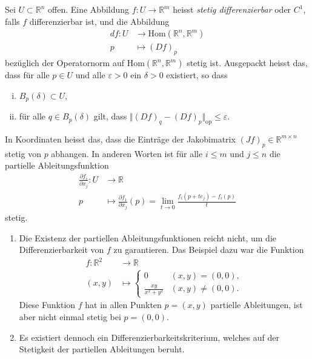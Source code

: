 \documentclass[../main.tex]{subfiles}
\begin{document}
\begin{definition}
  Sei $U \subset \mathbb{R}^n$ offen.
  Eine Abbildung $f \colon U \to \mathbb{R}^m$ heisst
  \emph{stetig differenzierbar} oder $C^1$,
  falls $f$ differenzierbar ist, und die Abbildung
  \begin{align*}
    df \colon U & \to \text{Hom}(\mathbb{R}^n, \mathbb{R}^m) \\
    p & \mapsto {(Df)}_p
  \end{align*}
  bezüglich der Operatornorm auf $\text{Hom}(\mathbb{R}^n, \mathbb{R}^m)$ 
  stetig ist.
  Ausgepackt heisst das, dass für alle $p \in U$ 
  und alle $\varepsilon > 0$ ein $\delta > 0$ 
  existiert, so dass
  \begin{enumerate}[(i)]
    \item $B_p(\delta) \subset U$, 
    \item für alle $q \in B_p(\delta)$ gilt, dass
      $\Vert {(Df)}_q - {(Df)}_p \Vert_{\text{op}} \leq \varepsilon$.
  \end{enumerate}
\end{definition}

In Koordinaten heisst das, dass die Einträge der
Jakobimatrix ${(Jf)}_p \in \mathbb{R}^{m \times n}$ stetig
von $p$ abhangen.
In anderen Worten ist für alle $i \leq m$ und $j \leq n$ 
die partielle Ableitungsfunktion
\begin{align*}
  \frac{\partial f_i}{\partial x_j} \colon U & \to \mathbb{R} \\
  p & \mapsto \frac{\partial f_1}{\partial x_j}(p)
  = \lim_{t \to 0} \frac{f_i(p + te_j) - f_i(p)}{t}
\end{align*}
stetig.

\begin{remarks}
  \leavevmode
  \begin{enumerate}[(1)]
    \item Die Existenz der partiellen Ableitungsfunktionen
      reicht nicht, um die Differenzierbarkeit von $f$ zu garantieren.
      Das Beispiel dazu war die Funktion
      \begin{align*}
        f \colon \mathbb{R}^2 & \to \mathbb{R} \\
        (x, y) & \mapsto 
        \begin{cases}
          0 & (x, y) = (0, 0),\\
          \frac{xy}{x^2 + y^2} & (x, y) \neq (0, 0).
        \end{cases}
      \end{align*}
      Diese Funktion $f$ hat in allen Punkten $p = (x, y)$ partielle
      Ableitungen, ist aber nicht einmal stetig bei $p = (0, 0)$.
    \item Es existiert dennoch ein Differenzierbarkeitskriterium,
      welches auf der Stetigkeit der partiellen Ableitungen beruht.
  \end{enumerate}
\end{remarks}
\end{document}
